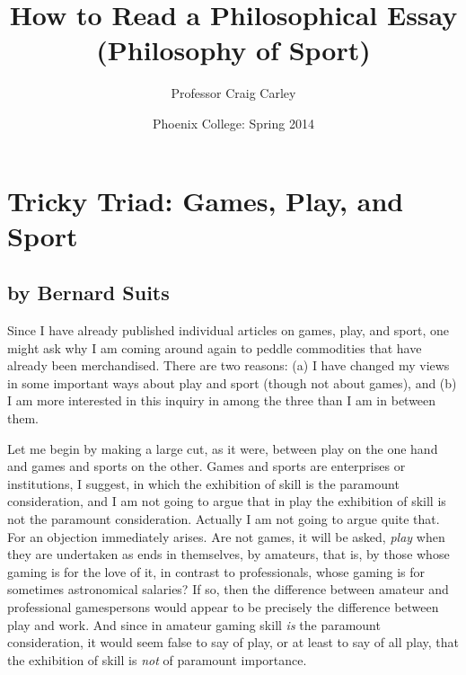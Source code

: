 \documentclass{tufte-handout}
\title{How to Read a Philosophical Essay\\
	(Philosophy of Sport)}
\author[Craig T. Carley]{Professor Craig Carley}
\date{Phoenix College: Spring 2014} %
\begin{document}
\maketitle %



\section{Tricky Triad: Games, Play, and Sport}
\subsection{by Bernard Suits}

Since I have already published individual articles on games, play, and sport, one might ask why I am coming around again to peddle commodities that have already been merchandised. There are two reasons: (a) I have changed my views in some important ways about play and sport (though not about games), and (b) I am more interested in this inquiry in \textsc{\color{darkred}{relations}} among the three than I am in \textsc{\color{darkred}{distinctions}} between them. 

Let me begin by making a large cut, as it were, between play on the one hand and games and sports on the other. Games and sports are enterprises or institutions, I suggest, in which the exhibition of skill is the paramount consideration, and I am not going to argue that in play the exhibition of skill is not the paramount consideration. Actually I am not going to argue quite that. For an objection immediately arises. Are not games, it will be asked, \textit{play} when they are undertaken as ends in themselves, by amateurs, that is, by those whose gaming is for the love of it, in contrast to professionals, whose gaming is for sometimes astronomical salaries? If so, then the difference between amateur and professional gamespersons would appear to be precisely the difference between play and work. And since in amateur gaming skill \textit{is} the paramount consideration, it would seem false to say of play, or at least to say of all play, that the exhibition of skill is \textit{not} of paramount importance. 
\end{document}

